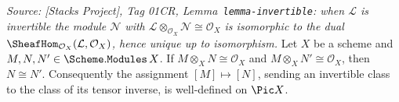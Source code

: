 \begin{lemma}\leanok
  \label{lem:isinvertible_inverse_welldef}
  \textit{Source: [Stacks Project], Tag 01CR, Lemma~\texttt{lemma-invertible}: when
  \(\mathcal{L}\) is invertible the module \(\mathcal{N}\) with
  \(\mathcal{L} \otimes_{\mathcal{O}_X} \mathcal{N} \cong \mathcal{O}_X\) is
  isomorphic to the dual \(\SheafHom_{\mathcal{O}_X}(\mathcal{L}, \mathcal{O}_X)\),
  hence unique up to isomorphism.}
  Let \(X\) be a scheme and \(M, N, N' \in \Scheme.\mathtt{Modules}\,X\). If
  \(M \otimes_X N \cong \mathcal{O}_X\) and \(M \otimes_X N' \cong \mathcal{O}_X\),
  then \(N \cong N'\). Consequently the assignment \([M] \mapsto [N]\), sending an
  invertible class to the class of its tensor inverse, is well-defined on
  \(\Pic X\).
\end{lemma}

